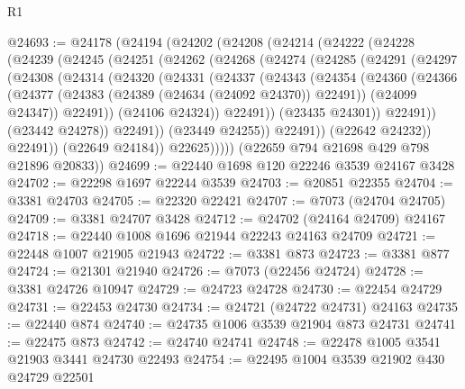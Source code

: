 \begin{lexlean}{R1}
\begin{coremodule}
@24693 := @24178
    (@24194
      (@24202
        (@24208
          (@24214
            (@24222
              (@24228
                (@24239
                  (@24245
                    (@24251
                      (@24262
                        (@24268
                          (@24274
                            (@24285
                              (@24291
                                (@24297
                                  (@24308
                                    (@24314
                                      (@24320
                                        (@24331
                                          (@24337
                                            (@24343
                                              (@24354
                                                (@24360
                                                  (@24366
                                                    (@24377
                                                      (@24383
                                                        (@24389 (@24634 (@24092 @24370)) @22491))
                                                      (@24099 @24347))
                                                    @22491))
                                                (@24106 @24324))
                                              @22491))
                                          (@23435 @24301))
                                        @22491))
                                    (@23442 @24278))
                                  @22491))
                              (@23449 @24255))
                            @22491))
                        (@22642 @24232))
                      @22491))
                  (@22649 @24184))
                @22625)))))
      (@22659 @794 @21698 @429 @798 @21896 @20833))
@24699 := @22440 @1698 @120 @22246 @3539 @24167 @3428
@24702 := @22298 @1697 @22244 @3539
@24703 := @20851 @22355
@24704 := @3381 @24703
@24705 := @22320 @22421
@24707 := @7073 (@24704 @24705)
@24709 := @3381 @24707 @3428
@24712 := @24702 (@24164 @24709) @24167
@24718 := @22440 @1008 @1696 @21944 @22243 @24163 @24709
@24721 := @22448 @1007 @21905 @21943
@24722 := @3381 @873
@24723 := @3381 @877
@24724 := @21301 @21940
@24726 := @7073 (@22456 @24724)
@24728 := @3381 @24726 @10947
@24729 := @24723 @24728
@24730 := @22454 @24729
@24731 := @22453 @24730
@24734 := @24721 (@24722 @24731) @24163
@24735 := @22440 @874
@24740 := @24735 @1006 @3539 @21904 @873 @24731
@24741 := @22475 @873
@24742 := @24740 @24741
@24748 := @22478 @1005 @3541 @21903 @3441 @24730 @22493
@24754 := @22495 @1004 @3539 @21902 @430 @24729 @22501

\end{coremodule}
\end{lexlean}
